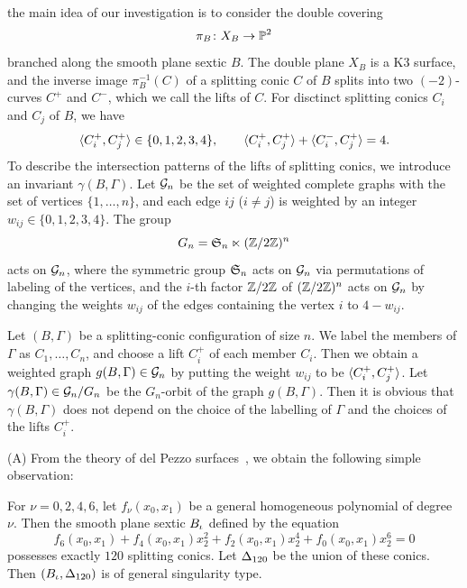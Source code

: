 \documentclass{amsart} %
\begin{document}
the main idea of our investigation is to consider
the double covering
\[
\pi_B \colon X_B \to \mathord{\mathbb{P}}^2
\]
branched along the smooth plane sextic $B$.
The double plane $X_B$ is a K3 surface,
and the inverse image $\pi_B^{-1}(C)$ of a splitting conic  $C$ of $B$
splits into two $(-2)$-curves $C^+$ and $C^-$,
which we call the lifts of $C$.
For disctinct splitting conics $C_i$ and $C_j$ of $B$,
we have
\[
\langle C_i^+, C_j^+ \rangle\in \{0,1,2,3,4\},
\qquad
\langle C_i^+, C_j^+ \rangle+\langle C_i^-, C_j^+ \rangle=4.
\]
To describe the intersection patterns of the lifts
of splitting conics,
we introduce an invariant $\gamma(B,\Gamma)$.
Let $\mathord{\mathcal{G}}_n$ be the set of weighted complete graphs
with the set of vertices $\{1,\ldots,n\}$,
and each edge $ij$ ($i\ne j$)
is weighted by an integer
$w_{ij} \in \{0,1,2,3,4\}$.
The group
\[
G_n = \mathord{\mathfrak{S}}_n \ltimes (\mathord{\mathbb{Z}}/2\mathord{\mathbb{Z}})^n
\]
acts on $\mathord{\mathcal{G}}_n$,
where the symmetric group $\mathord{\mathfrak{S}}_n$ acts on $\mathord{\mathcal{G}}_n$
via  permutations of labeling of the vertices,
and the $i$-th factor $\mathord{\mathbb{Z}}/2\mathord{\mathbb{Z}}$ of $(\mathord{\mathbb{Z}}/2\mathord{\mathbb{Z}})^n$
acts on $\mathord{\mathcal{G}}_n$ by changing the weights $w_{ij}$
of the edges containing the vertex $i$ to $4-w_{ij}$.
%
\begin{definition}
Let $(B,\Gamma)$ be a splitting-conic configuration of size $n$.
We label the members of $\Gamma$ as
$C_1,\ldots,C_n$, and choose a lift $C_i^+$
of each member $C_i$.
Then we obtain a weighted graph
$g(B,\Gamma) \in \mathord{\mathcal{G}}_n$
by putting the weight $w_{ij}$ to be $\langle C_i^+, C_j^+ \rangle$.
Let
$\gamma(B,\Gamma) \in \mathord{\mathcal{G}}_n/G_n$
be the $G_n$-orbit of the graph $g(B,\Gamma)$.
Then it is obvious that $\gamma(B,\Gamma)$
does not depend on the choice of the labelling
of  $\Gamma$ and the choices
of the lifts $C_i^+$.
\end{definition}
%
\par\medskip
(A) From the theory of del Pezzo surfaces~\cite{ShimadaTurk},
we obtain  the following simple observation:
%
\begin{proposition}\label{prop:120rats}
For $\nu=0,2,4,6$,
let $f_{\nu} (x_0, x_1)$ be a general  
homogeneous polynomial 
of degree $\nu$.
Then the smooth plane sextic $B_{\iota}$ defined by the equation 
%
\begin{equation}\label{eq:iotainvsextic}
f_6(x_0, x_1) +f_4(x_0, x_1) x_2^2 + f_2(x_0, x_1) x_2^4 + f_0(x_0, x_1) x_2^6=0
\end{equation}
%
possesses exactly $120$ splitting conics.
Let $\Delta_{120}$ be the union of these conics.
Then $(B_{\iota}, \Delta_{120})$ is of general singularity type.
\end{proposition}
\end{document}
